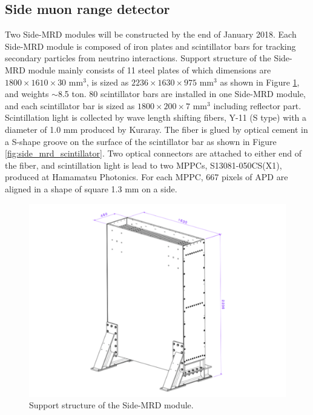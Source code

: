 \subsection{Side muon range detector}
Two Side-MRD modules will be constructed by the end of January 2018. 
Each Side-MRD module is composed of iron plates and scintillator bars for tracking secondary particles from neutrino interactions. 
Support structure of the Side-MRD module mainly consists of 11 steel plates of which dimensions are $1800\times1610\times30$ mm$^{3}$, is sized as $2236\times1630\times975$ mm$^{3}$ as shown in Figure \ref{fig:side_mrd_support_structure}, and weights $\sim$8.5 ton. 
80 scintillator bars are installed in one Side-MRD module, and each scintillator bar is sized as $1800\times200\times7$ mm$^{3}$ including reflector part. 
Scintillation light is collected by wave length shifting fibers, Y-11 (S type) with a diameter of 1.0 mm produced by Kuraray. 
The fiber is glued by optical cement in a S-shape groove on the surface of the scintillator bar as shown in Figure \ref{fig:side_mrd_scintillator}. 
Two optical connectors are attached to either end of the fiber, and scintillation light is lead to two MPPCs, S13081-050CS(X1), produced at Hamamatsu Photonics. 
For each MPPC, 667 pixels of APD are aligned in a shape of square 1.3 mm on a side. 

\begin{figure}[tbh]
\begin{center}
\includegraphics[width=0.8\linewidth]{fig/side_mrd_structure.pdf}
\end{center}
\caption{
Support structure of the Side-MRD module.
}
\label{fig:side_mrd_support_structure}
\end{figure}

